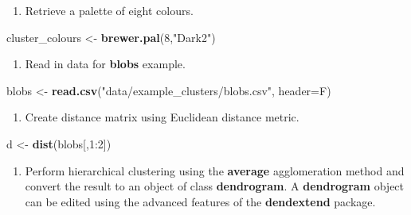 \documentclass[]{book}
\newenvironment{Shaded}{\begin{snugshade}}{\end{snugshade}}
\newcommand{\KeywordTok}[1]{\textcolor[rgb]{0.13,0.29,0.53}{\textbf{{#1}}}}
\newcommand{\DataTypeTok}[1]{\textcolor[rgb]{0.13,0.29,0.53}{{#1}}}
\newcommand{\DecValTok}[1]{\textcolor[rgb]{0.00,0.00,0.81}{{#1}}}
\newcommand{\StringTok}[1]{\textcolor[rgb]{0.31,0.60,0.02}{{#1}}}
\newcommand{\NormalTok}[1]{{#1}}
\providecommand{\tightlist}{%
  \setlength{\itemsep}{0pt}\setlength{\parskip}{0pt}}
\theoremstyle{definition}
\theoremstyle{definition}
\theoremstyle{definition}
\theoremstyle{remark}
\begin{document}
\begin{enumerate}
\def\labelenumi{\arabic{enumi}.}
\setcounter{enumi}{1}
\tightlist
\item
  Retrieve a palette of eight colours.
\end{enumerate}

\begin{Shaded}
\begin{Highlighting}[]
\NormalTok{cluster_colours <-}\StringTok{ }\KeywordTok{brewer.pal}\NormalTok{(}\DecValTok{8}\NormalTok{,}\StringTok{"Dark2"}\NormalTok{)}
\end{Highlighting}
\end{Shaded}

\begin{enumerate}
\def\labelenumi{\arabic{enumi}.}
\setcounter{enumi}{2}
\tightlist
\item
  Read in data for \textbf{blobs} example.
\end{enumerate}

\begin{Shaded}
\begin{Highlighting}[]
\NormalTok{blobs <-}\StringTok{ }\KeywordTok{read.csv}\NormalTok{(}\StringTok{"data/example_clusters/blobs.csv"}\NormalTok{, }\DataTypeTok{header=}\NormalTok{F)}
\end{Highlighting}
\end{Shaded}

\begin{enumerate}
\def\labelenumi{\arabic{enumi}.}
\setcounter{enumi}{3}
\tightlist
\item
  Create distance matrix using Euclidean distance metric.
\end{enumerate}

\begin{Shaded}
\begin{Highlighting}[]
\NormalTok{d <-}\StringTok{ }\KeywordTok{dist}\NormalTok{(blobs[,}\DecValTok{1}\NormalTok{:}\DecValTok{2}\NormalTok{])}
\end{Highlighting}
\end{Shaded}

\begin{enumerate}
\def\labelenumi{\arabic{enumi}.}
\setcounter{enumi}{4}
\tightlist
\item
  Perform hierarchical clustering using the \textbf{average}
  agglomeration method and convert the result to an object of class
  \textbf{dendrogram}. A \textbf{dendrogram} object can be edited using
  the advanced features of the \textbf{dendextend} package.
\end{enumerate}
\end{document}
